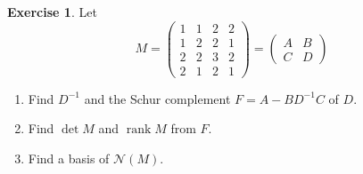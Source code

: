 \documentclass[12pt]{article}
\DeclareMathOperator{\rank}{rank}
\theoremstyle{definition}
\newtheorem{exercise}{Exercise}
\begin{document}
\begin{exercise}\label{r5d-dr-schur}
Let
\[
M=\left(\begin{array}{cc|cc}1&1&2&2\\1&2&2&1\\\hline2&2&3&2\\2&1&2&1\end{array}\right)
=\begin{pmatrix}A&B\\C&D\end{pmatrix}
\]
\begin{enumerate}
\item Find \(D^{-1}\) and the Schur complement \(F=A-BD^{-1}C\) of \(D\).
\item Find \(\det M\) and \(\rank M\) from \(F\).
\item Find a basis of \(\mathcal N(M)\).
\end{enumerate}
\end{exercise}
\end{document}
